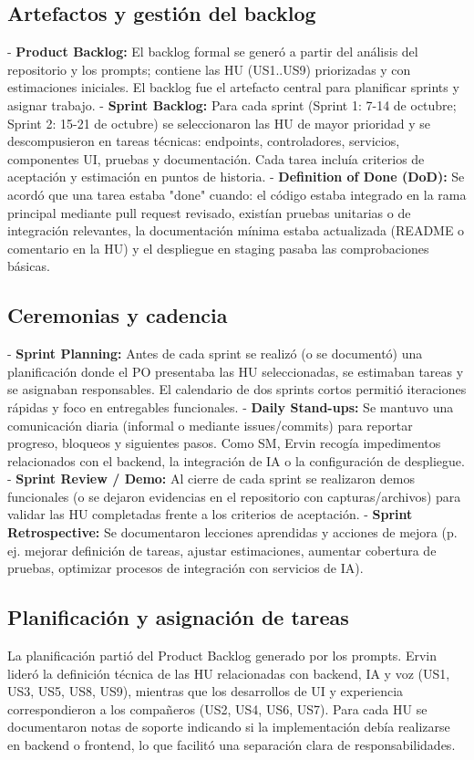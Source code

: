 \documentclass[12pt]{article}
\begin{document}
\subsection{Artefactos y gestión del backlog}
- \textbf{Product Backlog:} El backlog formal se generó a partir del análisis del repositorio y los prompts; contiene las HU (US1..US9) priorizadas y con estimaciones iniciales. El backlog fue el artefacto central para planificar sprints y asignar trabajo.
- \textbf{Sprint Backlog:} Para cada sprint (Sprint 1: 7-14 de octubre; Sprint 2: 15-21 de octubre) se seleccionaron las HU de mayor prioridad y se descompusieron en tareas técnicas: endpoints, controladores, servicios, componentes UI, pruebas y documentación. Cada tarea incluía criterios de aceptación y estimación en puntos de historia.
- \textbf{Definition of Done (DoD):} Se acordó que una tarea estaba "done" cuando: el código estaba integrado en la rama principal mediante pull request revisado, existían pruebas unitarias o de integración relevantes, la documentación mínima estaba actualizada (README o comentario en la HU) y el despliegue en staging pasaba las comprobaciones básicas.

\subsection{Ceremonias y cadencia}
- \textbf{Sprint Planning:} Antes de cada sprint se realizó (o se documentó) una planificación donde el PO presentaba las HU seleccionadas, se estimaban tareas y se asignaban responsables. El calendario de dos sprints cortos permitió iteraciones rápidas y foco en entregables funcionales.
- \textbf{Daily Stand-ups:} Se mantuvo una comunicación diaria (informal o mediante issues/commits) para reportar progreso, bloqueos y siguientes pasos. Como SM, Ervin recogía impedimentos relacionados con el backend, la integración de IA o la configuración de despliegue.
- \textbf{Sprint Review / Demo:} Al cierre de cada sprint se realizaron demos funcionales (o se dejaron evidencias en el repositorio con capturas/archivos) para validar las HU completadas frente a los criterios de aceptación.
- \textbf{Sprint Retrospective:} Se documentaron lecciones aprendidas y acciones de mejora (p. ej. mejorar definición de tareas, ajustar estimaciones, aumentar cobertura de pruebas, optimizar procesos de integración con servicios de IA).

\subsection{Planificación y asignación de tareas}
La planificación partió del Product Backlog generado por los prompts. Ervin lideró la definición técnica de las HU relacionadas con backend, IA y voz (US1, US3, US5, US8, US9), mientras que los desarrollos de UI y experiencia correspondieron a los compañeros (US2, US4, US6, US7). Para cada HU se documentaron notas de soporte indicando si la implementación debía realizarse en backend o frontend, lo que facilitó una separación clara de responsabilidades.
\end{document}
